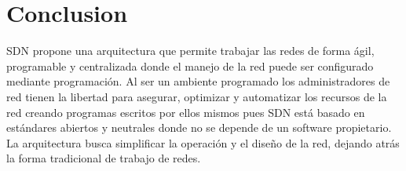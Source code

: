 \documentclass[10pt,journal,compsoc]{IEEEtran}
\begin{document}




\section{Conclusion}

SDN propone una arquitectura que permite trabajar las redes de forma ágil, programable y centralizada donde el manejo de la red puede ser configurado mediante programación.
Al ser un ambiente programado los administradores de red tienen la libertad para asegurar, optimizar y automatizar los recursos de la red creando programas escritos por ellos mismos pues SDN está basado en estándares abiertos y neutrales donde no se depende de un software propietario. La arquitectura busca simplificar la operación y el diseño de la red, dejando atrás la forma tradicional de trabajo de redes.






%
\end{document}
